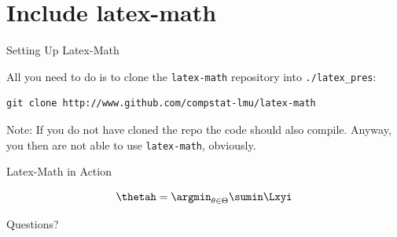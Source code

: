 \section{Include latex-math}
\begin{frame}[fragile]{Setting Up Latex-Math}

All you need to do is to clone the \texttt{latex-math} repository into
\texttt{./latex\_pres}:
\begin{verbatim}
git clone http://www.github.com/compstat-lmu/latex-math
\end{verbatim}

\alert{Note:} If you do not have cloned the repo the code should also compile.
Anyway, you then are not able to use \texttt{latex-math}, obviously.

\end{frame}

\begin{frame}{Latex-Math in Action}

\[
\thetah = \argmin_{\theta \in \Theta} \sumin \Lxyi
\]

\end{frame}


\begin{frame}
  Questions?
\end{frame}



